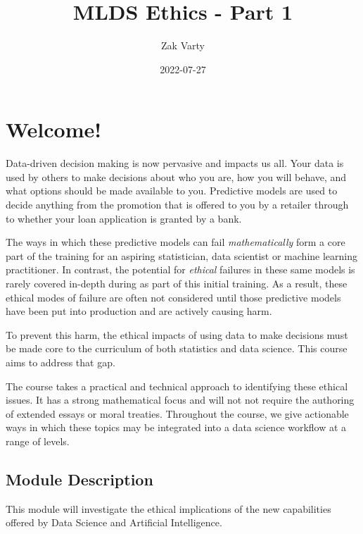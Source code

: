 \documentclass[
]{book}
\title{MLDS Ethics - Part 1}
\author{Zak Varty}
\date{2022-07-27}
\theoremstyle{definition}
\theoremstyle{definition}
\theoremstyle{definition}
\theoremstyle{definition}
\theoremstyle{remark}
\begin{document}
\maketitle

{
\setcounter{tocdepth}{1}
\tableofcontents
}
\hypertarget{welcome}{%
\chapter*{Welcome!}\label{welcome}}

Data-driven decision making is now pervasive and impacts us all. Your data is used by others to make decisions about who you are, how you will behave, and what options should be made available to you. Predictive models are used to decide anything from the promotion that is offered to you by a retailer through to whether your loan application is granted by a bank.

The ways in which these predictive models can fail \emph{mathematically} form a core part of the training for an aspiring statistician, data scientist or machine learning practitioner. In contrast, the potential for \emph{ethical} failures in these same models is rarely covered in-depth during as part of this initial training. As a result, these ethical modes of failure are often not considered until those predictive models have been put into production and are actively causing harm.

To prevent this harm, the ethical impacts of using data to make decisions must be made core to the curriculum of both statistics and data science. This course aims to address that gap.

The course takes a practical and technical approach to identifying these ethical issues. It has a strong mathematical focus and will not not require the authoring of extended essays or moral treaties. Throughout the course, we give actionable ways in which these topics may be integrated into a data science workflow at a range of levels.

\hypertarget{module-description}{%
\section*{Module Description}\label{module-description}}

This module will investigate the ethical implications of the new capabilities offered by Data Science and Artificial Intelligence.
\end{document}
